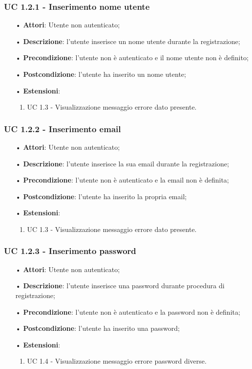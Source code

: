 \subsubsection{UC 1.2.1 - Inserimento nome utente}
\begin{itemize}
	\item[•]\textbf{Attori}: Utente non autenticato;
	\item[•]\textbf{Descrizione}: l'utente inserisce un nome utente durante la registrazione;
	\item[•]\textbf{Precondizione}: l'utente non è autenticato e il nome utente non è definito;
	\item[•]\textbf{Postcondizione}: l'utente ha inserito un nome utente;
	\item[•] \textbf{Estensioni}:
	\begin{enumerate}
		\item UC 1.3 - Visualizzazione messaggio errore dato presente.
	\end{enumerate}
\end{itemize}

\subsubsection{UC 1.2.2 - Inserimento email}
\begin{itemize}
	\item[•]\textbf{Attori}: Utente non autenticato;
	\item[•]\textbf{Descrizione}: l'utente inserisce la sua email durante la registrazione;
	\item[•]\textbf{Precondizione}: l'utente non è autenticato e la email non è definita;
	\item[•]\textbf{Postcondizione}: l'utente ha inserito la propria email;
	\item[•] \textbf{Estensioni}:
		\begin{enumerate}
		\item UC 1.3 - Visualizzazione messaggio errore dato presente.
	\end{enumerate}
\end{itemize}

\subsubsection{UC 1.2.3 - Inserimento password}
\begin{itemize}
	\item[•]\textbf{Attori}: Utente non autenticato;
	\item[•]\textbf{Descrizione}: l'utente inserisce una password durante procedura di registrazione;
	\item[•]\textbf{Precondizione}: l'utente non è autenticato e la password non è definita;
	\item[•]\textbf{Postcondizione}: l'utente ha inserito una password;
	\item[•] \textbf{Estensioni}:
	\begin{enumerate}
		\item UC 1.4 - Visualizzazione messaggio errore password diverse.
	\end{enumerate}
\end{itemize}

